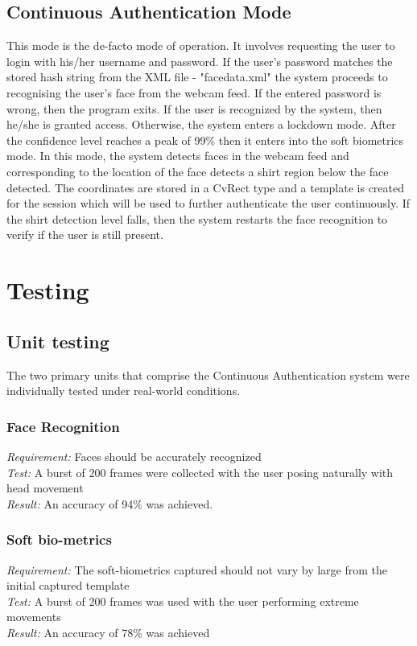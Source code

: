 \documentclass[12pt]{article}			%
\begin{document}
\subsection { Continuous Authentication Mode }
This mode is the de-facto mode of operation. It involves requesting the user to login with his/her username and password. If the user's password matches the stored hash string from the XML file - "facedata.xml" the system proceeds to recognising the user's face from the webcam feed. If the entered password is wrong, then the program exits. If the user is recognized by the system, then he/she is granted access. Otherwise, the system enters a lockdown mode. After the confidence level reaches a peak of 99\% then it enters into the soft biometrics mode. In this mode, the system detects faces in the webcam feed and corresponding to the location of the face detects a shirt region below the face detected. The coordinates are stored in a CvRect type and a template is created for the session which will be used to further authenticate the user continuously. If the shirt detection level falls, then the system restarts the face recognition to verify if the user is still present.  

\section{ Testing }

\subsection{ Unit testing }
The two primary units that comprise the Continuous Authentication system were individually tested under real-world conditions.

\subsubsection{ Face Recognition }
\emph{ Requirement: } Faces should be accurately recognized\\
\emph{ Test: } A burst of 200 frames were collected with the user posing naturally with head movement\\
\emph{ Result: } An accuracy of 94\% was achieved.\\

\subsubsection{ Soft bio-metrics }
\emph{ Requirement: } The soft-biometrics captured should not vary by large from the initial captured template\\
\emph{ Test: } A burst of 200 frames was used with the user performing extreme movements\\
\emph{ Result: } An accuracy of 78\% was achieved\\
\end{document}
